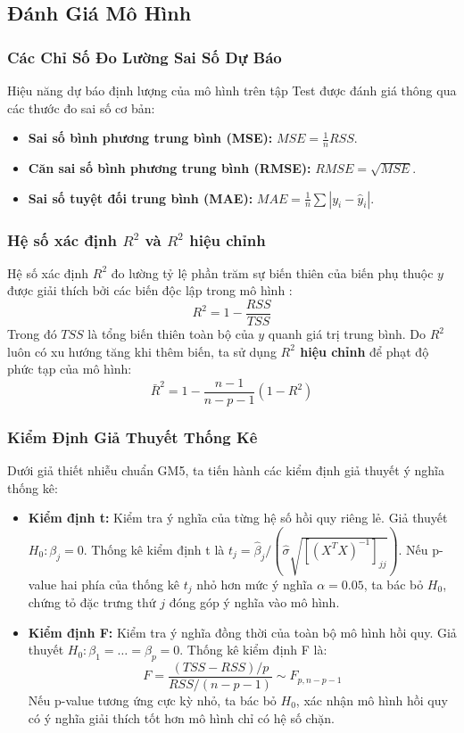 \documentclass[12pt,a4paper]{article}
\begin{document}
\subsection{Đánh Giá Mô Hình}

\subsubsection{Các Chỉ Số Đo Lường Sai Số Dự Báo}
Hiệu năng dự báo định lượng của mô hình trên tập Test được đánh giá thông qua các thước đo sai số cơ bản:
\begin{itemize}
    \item \textbf{Sai số bình phương trung bình (MSE):} $MSE = \frac{1}{n} RSS$.
    \item \textbf{Căn sai số bình phương trung bình (RMSE):} $RMSE = \sqrt{MSE}$.
    \item \textbf{Sai số tuyệt đối trung bình (MAE):} $MAE = \frac{1}{n} \sum |y_i - \hat{y}_i|$.
\end{itemize}

\subsubsection{Hệ số xác định $R^2$ và $R^2$ hiệu chỉnh}
Hệ số xác định $R^2$ đo lường tỷ lệ phần trăm sự biến thiên của biến phụ thuộc $y$ được giải thích bởi các biến độc lập trong mô hình \cite{james}:
\begin{equation}
    R^2 = 1 - \frac{RSS}{TSS}
\end{equation}
Trong đó $TSS$ là tổng biến thiên toàn bộ của $y$ quanh giá trị trung bình. Do $R^2$ luôn có xu hướng tăng khi thêm biến, ta sử dụng \textbf{$R^2$ hiệu chỉnh} để phạt độ phức tạp của mô hình:
\begin{equation}
    \bar{R}^2 = 1 - \frac{n - 1}{n - p - 1} (1 - R^2)
\end{equation}

\subsubsection{Kiểm Định Giả Thuyết Thống Kê}
Dưới giả thiết nhiễu chuẩn GM5, ta tiến hành các kiểm định giả thuyết ý nghĩa thống kê:
\begin{itemize}
    \item \textbf{Kiểm định t:} Kiểm tra ý nghĩa của từng hệ số hồi quy riêng lẻ. Giả thuyết $H_0: \beta_j = 0$. Thống kê kiểm định t là $t_j = \hat{\beta}_j / (\hat{\sigma} \sqrt{[(X^T X)^{-1}]_{jj}})$. Nếu p-value hai phía của thống kê $t_j$ nhỏ hơn mức ý nghĩa $\alpha = 0.05$, ta bác bỏ $H_0$, chứng tỏ đặc trưng thứ $j$ đóng góp ý nghĩa vào mô hình.
    \item \textbf{Kiểm định F:} Kiểm tra ý nghĩa đồng thời của toàn bộ mô hình hồi quy. Giả thuyết $H_0: \beta_1 = \dots = \beta_p = 0$. Thống kê kiểm định F là:
    \begin{equation}
        F = \frac{(TSS - RSS) / p}{RSS / (n - p - 1)} \sim F_{p, n-p-1}
    \end{equation}
    Nếu p-value tương ứng cực kỳ nhỏ, ta bác bỏ $H_0$, xác nhận mô hình hồi quy có ý nghĩa giải thích tốt hơn mô hình chỉ có hệ số chặn.
\end{itemize}
\end{document}
